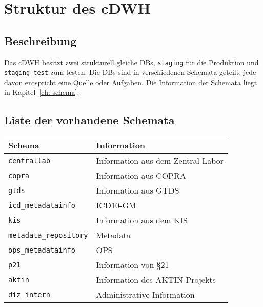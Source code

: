 \chapter{Struktur des \ac{cDWH}}
 \label{ch:strcsdwh} 
    \section{Beschreibung}
    Das \ac{cDWH} besitzt zwei strukturell gleiche \acp{DB}, \texttt{staging} für die Produktion und \texttt{staging\_test} zum testen. Die \acp{DB} sind in verschiedenen Schemata geteilt, jede davon entspricht eine Quelle oder Aufgaben. Die Information der Schemata liegt in Kapitel~\ref{ch: schema}.
    
    \section{Liste der vorhandene Schemata}
    
    \begin{center}
    	\begin{tabular}{|| l | l ||} 
    		\hline
    		Schema & Information \\ [0.5ex] 
    		\hline\hline
    		\texttt{centrallab} & Information aus dem Zentral Labor \\ 
    		\hline
    		\texttt{copra} & Information aus COPRA \\
    		\hline
    		\texttt{gtds} & Information aus GTDS  \\
    		\hline
    		\texttt{icd\_metadatainfo} & ICD10-GM  \\
    		\hline
    		\texttt{kis} & Information aus dem \ac{KIS}  \\ [1ex] 
    		\hline
        	\texttt{metadata\_repository} & Metadata \\
        	\hline 
        	\texttt{ops\_metadatainfo} & OPS  \\
        	\hline
        	\texttt{p21} & Information von \S 21  \\ 
        	\hline
        	\texttt{aktin} & Information des AKTIN-Projekts\\
        	\hline
        	\texttt{diz\_intern} & Administrative Information\\
        	\hline
    	\end{tabular}
    \end{center}